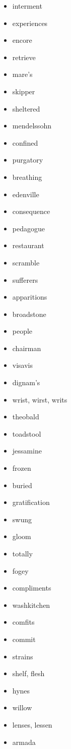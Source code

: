 \documentclass{article}
\begin{document}
\begin{itemize}
    \item interment
    \item experiences
    \item encore
    \item retrieve
    \item mare's
    \item skipper
    \item sheltered
    \item mendelssohn
    \item confined
    \item purgatory
    \item breathing
    \item edenville
    \item consequence
    \item pedagogue
    \item restaurant
    \item scramble
    \item sufferers
    \item apparitions
    \item broadstone
    \item people
    \item chairman
    \item visavis
    \item dignam's
    \item wrist, wirst, writs
    \item theobald
    \item toadstool
    \item jessamine
    \item frozen
    \item buried
    \item gratification
    \item swung
    \item gloom
    \item totally
    \item fogey
    \item compliments
    \item washkitchen
    \item comfits
    \item commit
    \item strains
    \item shelf, flesh
    \item hynes
    \item willow
    \item lenses, lessen
    \item armada

\end{itemize}
\end{document}

